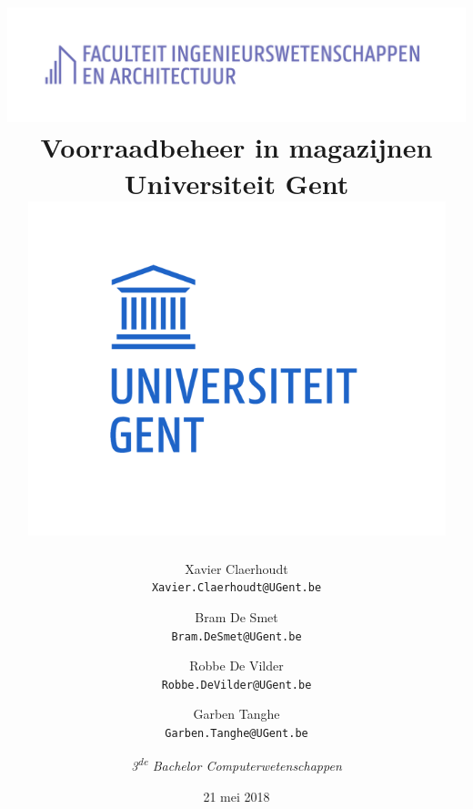 \documentclass[a4paper,12pt]{report}
\begin{document}
\title{
	{\includegraphics{UGent_FEA_Logo.png}}\\
	{Voorraadbeheer in magazijnen}\\
	{\large Universiteit Gent}\\
	{\includegraphics{UGent_Logo.png}}
}	
\author{Xavier Claerhoudt\\
\texttt{Xavier.Claerhoudt@UGent.be}
\and Bram De Smet\\
\texttt{Bram.DeSmet@UGent.be}
\and Robbe De Vilder\\
\texttt{Robbe.DeVilder@UGent.be}
\and Garben Tanghe\\
\texttt{Garben.Tanghe@UGent.be}
\and \textit{3\textsuperscript{de} Bachelor Computerwetenschappen}}
\date{21 mei 2018}
\maketitle


\tableofcontents
\listoffigures
\listoftables









\renewcommand{\bibname}{Referenties}


\end{document}
